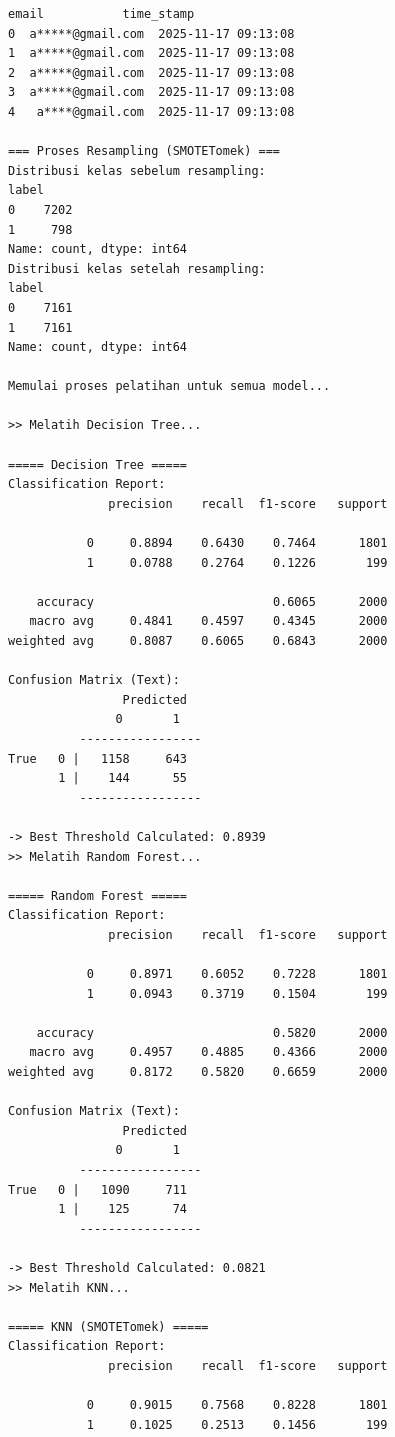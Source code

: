 \begin{lstlisting}[caption={Output 4}]
              email           time_stamp  
0  a*****@gmail.com  2025-11-17 09:13:08  
1  a*****@gmail.com  2025-11-17 09:13:08  
2  a*****@gmail.com  2025-11-17 09:13:08  
3  a*****@gmail.com  2025-11-17 09:13:08  
4   a****@gmail.com  2025-11-17 09:13:08  

=== Proses Resampling (SMOTETomek) ===
Distribusi kelas sebelum resampling: 
label
0    7202
1     798
Name: count, dtype: int64
Distribusi kelas setelah resampling: 
label
0    7161
1    7161
Name: count, dtype: int64

Memulai proses pelatihan untuk semua model...

>> Melatih Decision Tree...

===== Decision Tree =====
Classification Report:
              precision    recall  f1-score   support

           0     0.8894    0.6430    0.7464      1801
           1     0.0788    0.2764    0.1226       199

    accuracy                         0.6065      2000
   macro avg     0.4841    0.4597    0.4345      2000
weighted avg     0.8087    0.6065    0.6843      2000

Confusion Matrix (Text):
                Predicted
               0       1
          -----------------
True   0 |   1158     643
       1 |    144      55
          -----------------

-> Best Threshold Calculated: 0.8939
>> Melatih Random Forest...

===== Random Forest =====
Classification Report:
              precision    recall  f1-score   support

           0     0.8971    0.6052    0.7228      1801
           1     0.0943    0.3719    0.1504       199

    accuracy                         0.5820      2000
   macro avg     0.4957    0.4885    0.4366      2000
weighted avg     0.8172    0.5820    0.6659      2000

Confusion Matrix (Text):
                Predicted
               0       1
          -----------------
True   0 |   1090     711
       1 |    125      74
          -----------------

-> Best Threshold Calculated: 0.0821
>> Melatih KNN...

===== KNN (SMOTETomek) =====
Classification Report:
              precision    recall  f1-score   support

           0     0.9015    0.7568    0.8228      1801
           1     0.1025    0.2513    0.1456       199


\end{lstlisting}
